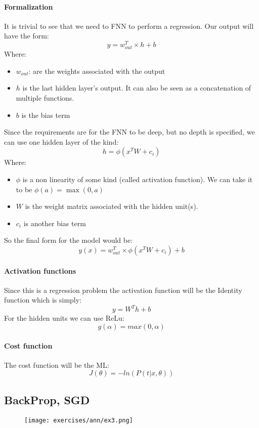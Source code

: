 \paragraph{Formalization}
It is trivial to see that we need to FNN to perform a regression.
Our output will have the form:
$$y=w_{out}^T\times h+b$$
Where:
\begin{itemize}
\item $w_{out}$: are the weights associated with the output
\item $h$ is the last hidden layer's output. It can also be seen as a concatenation of multiple functions.
\item $b$ is the bias term
\end{itemize}
Since the requirements are for the FNN to be deep, but no depth is specified, we can use one hidden layer of the kind:
$$h=\phi(x^TW+c_i)$$
Where:
\begin{itemize}
\item $\phi$ is a non linearity of some kind (called activation function). We can take it to be $\phi(a)=\max(0,a)$
\item $W$ is the weight matrix associated with the hidden unit(s).
\item $c_i$ is another bias term 
\end{itemize}

So the final form for the model would be:
$$y(x)=w_{out}^T\times \phi(x^TW+c_i)+b$$

\paragraph{Activation functions}
Since this is a regression problem the activation function will be the Identity function which is simply:
$$y=W^Th+b$$
For the hidden units we can use ReLu:
$$g(\alpha)=max(0,\alpha)$$

\paragraph{Cost function }
The cost function will be the ML:
$$J(\theta)=-ln(P(t|x,\theta))$$

\subsection{BackProp, SGD}

\begin{figure}[H]
    \centering
    \texttt{[image: exercises/ann/ex3.png]}
\end{figure}

